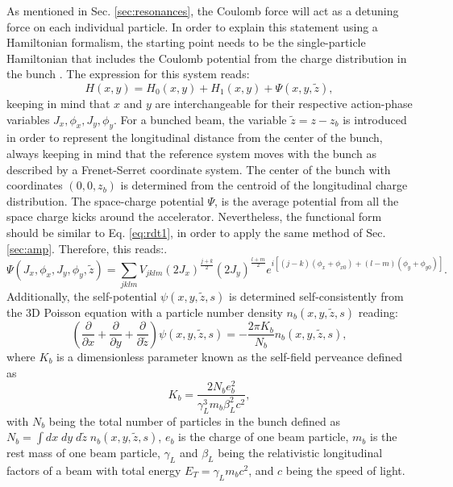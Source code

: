 As mentioned in Sec. \ref{sec:resonances}, the Coulomb force will act as a detuning force on each individual particle. In order to explain this statement using a Hamiltonian formalism, the starting point needs to be the single-particle Hamiltonian that includes the Coulomb potential from the charge distribution in the bunch \cite{witchcraft}. The expression for this system reads:
\begin{equation}
    \label{eq:hpsi}
    H(x,y)=H_{0}(x,y)+H_{1}(x,y)+\Psi(x,y,\tilde{z}), 
\end{equation}     
keeping in mind that $x$ and $y$ are interchangeable for their respective action-phase variables $J_x,\phi_x,J_y, \phi_y$. For a bunched beam, the variable $\tilde{z}=z-z_b$ is introduced in order to represent the longitudinal distance from the center of the bunch, always keeping in mind that the reference system moves with the bunch as described by a Frenet-Serret coordinate system. The center of the bunch with coordinates $(0,0,z_b)$ is determined from the centroid of the longitudinal charge distribution. The space-charge potential $\Psi$, is the average potential from all the space charge kicks around the accelerator. Nevertheless, the functional form should be similar to Eq. \ref{eq:rdt1}, in order to apply the same method of Sec. \ref{sec:amp}. Therefore, this reads:.
\begin{equation}
    \label{eq:scpot1}
    \Psi(J_x,\phi_x,J_y, \phi_y,\tilde{z})= \sum_{jklm} V_{jklm} \left( 2 J_x\right)^{\frac{j+k}{2}} \left( 2 J_y\right)^{\frac{l+m}{2}} e^{i\left[ \left( j-k \right)\left( \phi_x+\phi_{x0} \right)+ \left( l-m \right) \left( \phi_y+\phi_{y0} \right)\right]}.
\end{equation}
Additionally, the self-potential $\psi(x,y,\tilde{z},s)$ is determined self-consistently from the 3D Poisson equation with a particle number density $n_b(x,y,\tilde{z},s)$ reading:
\begin{equation}
    \label{eq:poisson1}
    \left( \frac{\partial}{\partial x}+\frac{\partial}{\partial y}+\frac{\partial}{\partial \tilde{z}}\right)\psi (x,y,\tilde{z},s)=-\frac{2 \pi K_b}{N_b}n_b(x,y,\tilde{z},s), 
\end{equation}
where $K_b$ is a dimensionless parameter known as the self-field perveance defined as
\begin{equation}
    \label{eq:perv}
    K_b = \frac{2 N_b e_b^2}{\gamma _L^3 m_b \beta_L^2 c^2},
\end{equation}
with $N_b$ being the total number of particles in the bunch defined as $N_b=\int dx \; dy \; d\tilde{z} \; n_b(x,y,\tilde{z},s)$, $e_b$ is the charge of one beam particle, $m_b$ is the rest mass of one beam particle, $\gamma_L$ and $\beta_L$ being the relativistic longitudinal factors of a beam with total energy $E_T=\gamma_L m_b c^2$, and $c$ being the speed of light.


